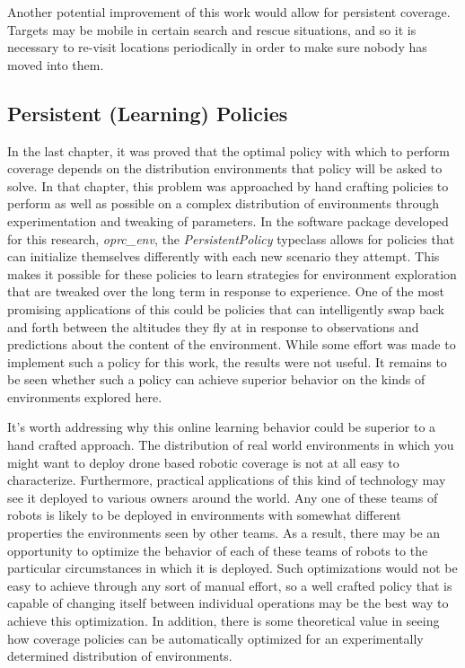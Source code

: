 Another potential improvement of this work would allow for persistent coverage. Targets may be mobile in certain search and rescue situations, and so it is necessary to re-visit locations periodically in order to make sure nobody has moved into them. %

\subsection{Persistent (Learning) Policies}

In the last chapter, it was proved that the optimal policy with which to perform coverage depends on the distribution environments that policy will be asked to solve. In that chapter, this problem was approached by hand crafting policies to perform as well as possible on a complex distribution of environments through experimentation and tweaking of parameters. In the software package developed for this research, \textit{oprc\_env}, the \textit{PersistentPolicy} typeclass allows for policies that can initialize themselves differently with each new scenario they attempt. This makes it possible for these policies to learn strategies for environment exploration that are tweaked over the long term in response to experience. One of the most promising applications of this could be policies that can intelligently swap back and forth between the altitudes they fly at in response to observations and predictions about the content of the environment. While some effort was made to implement such a policy for this work, the results were not useful. It remains to be seen whether such a policy can achieve superior behavior on the kinds of environments explored here.


It's worth addressing why this online learning behavior could be superior to a hand crafted approach. The distribution of real world environments in which you might want to deploy drone based robotic coverage is not at all easy to characterize. Furthermore, practical applications of this kind of  technology may see it deployed to various owners around the world. Any one of these teams of robots is likely to be deployed in environments with somewhat different properties the environments seen by other teams. As a result, there may be an opportunity to optimize the behavior of each of these teams of robots to the particular circumstances in which it is deployed. Such optimizations would not be easy to achieve through any sort of manual effort, so a well crafted policy that is capable of changing itself between individual operations may be the best way to achieve this optimization. In addition, there is some theoretical value in seeing how coverage policies can be automatically optimized for an experimentally determined distribution of environments.